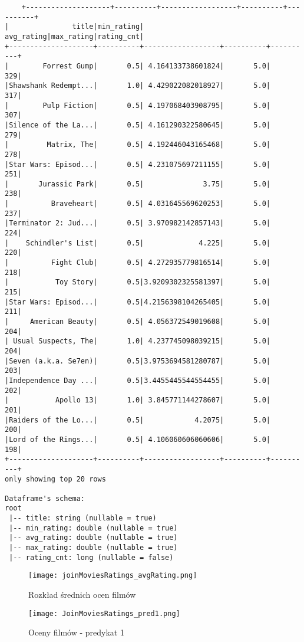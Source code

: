 \documentclass{article}
\begin{document}
\begin{verbatim}
    +--------------------+----------+------------------+----------+----------+
|               title|min_rating|        avg_rating|max_rating|rating_cnt|
+--------------------+----------+------------------+----------+----------+
|        Forrest Gump|       0.5| 4.164133738601824|       5.0|       329|
|Shawshank Redempt...|       1.0| 4.429022082018927|       5.0|       317|
|        Pulp Fiction|       0.5| 4.197068403908795|       5.0|       307|
|Silence of the La...|       0.5| 4.161290322580645|       5.0|       279|
|         Matrix, The|       0.5| 4.192446043165468|       5.0|       278|
|Star Wars: Episod...|       0.5| 4.231075697211155|       5.0|       251|
|       Jurassic Park|       0.5|              3.75|       5.0|       238|
|          Braveheart|       0.5| 4.031645569620253|       5.0|       237|
|Terminator 2: Jud...|       0.5| 3.970982142857143|       5.0|       224|
|    Schindler's List|       0.5|             4.225|       5.0|       220|
|          Fight Club|       0.5| 4.272935779816514|       5.0|       218|
|           Toy Story|       0.5|3.9209302325581397|       5.0|       215|
|Star Wars: Episod...|       0.5|4.2156398104265405|       5.0|       211|
|     American Beauty|       0.5| 4.056372549019608|       5.0|       204|
| Usual Suspects, The|       1.0| 4.237745098039215|       5.0|       204|
|Seven (a.k.a. Se7en)|       0.5|3.9753694581280787|       5.0|       203|
|Independence Day ...|       0.5|3.4455445544554455|       5.0|       202|
|           Apollo 13|       1.0| 3.845771144278607|       5.0|       201|
|Raiders of the Lo...|       0.5|            4.2075|       5.0|       200|
|Lord of the Rings...|       0.5| 4.106060606060606|       5.0|       198|
+--------------------+----------+------------------+----------+----------+
only showing top 20 rows

Dataframe's schema:
root
 |-- title: string (nullable = true)
 |-- min_rating: double (nullable = true)
 |-- avg_rating: double (nullable = true)
 |-- max_rating: double (nullable = true)
 |-- rating_cnt: long (nullable = false)
\end{verbatim}

\begin{figure}[H]
    \centering
    \texttt{[image: joinMoviesRatings\_avgRating.png]}
    \caption{Rozkład średnich ocen filmów}
    \label{fig:movies_ratings_avg}
\end{figure}

\begin{figure}[H]
    \centering
    \texttt{[image: JoinMoviesRatings\_pred1.png]}
    \caption{Oceny filmów - predykat 1}
    \label{fig:movies_ratings_pred1}
\end{figure}
\end{document}
